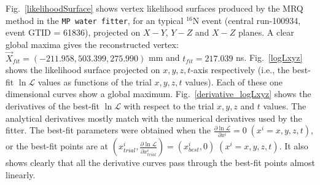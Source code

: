 Fig.~\ref{likelihoodSurface} shows vertex likelihood surfaces produced by the MRQ method in the \texttt{MP water fitter}, for an typical {$^{16}$}N event (central run-100934, event GTID = 61836), projected on $X-Y$, $Y-Z$ and $X-Z$ planes. A clear global maxima gives the reconstructed vertex: $\vec{X}_{fit}=(-211.958, 503.399, 275.990)$ mm and $t_{fit}=217.039$ ns. Fig.~\ref{logLxyz} shows the likelihood surface projected on $x,y,z,t$-axis respectively (i.e., the best-fit $\ln \mathcal{L}$ values as functions of the trial $x,y,z,t$ values). Each of these one dimensional curves show a global maximum. Fig.~\ref{derivative_logLxyz} shows the derivatives of the best-fit $\ln \mathcal{L}$ with respect to the trial $x,y,z$ and $t$ values. The analytical derivatives mostly match with the numerical derivatives used by the fitter. The best-fit parameters were obtained when the $\frac{\partial \ln \mathcal{L}}{\partial x^i} = 0\; (x^i = x,y,z,t)$, or the best-fit points are at $(x^i_{trial},\frac{\partial \ln \mathcal{L}}{\partial x^i_{trial}} )=(x^i_{best},0)\; (x^i = x,y,z,t)$. It also shows clearly that all the derivative curves pass through the best-fit points almost linearly.

